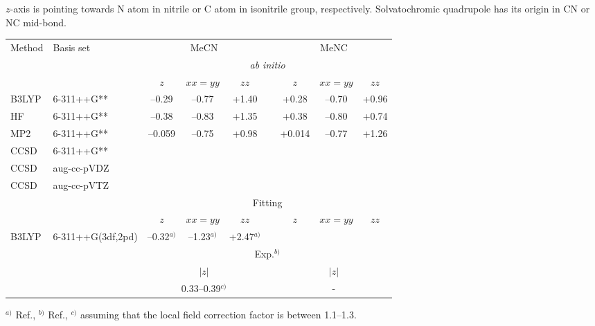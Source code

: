 \documentclass[a4paper,titlepage,twoside,fleqn,12pt]{book}
\begin{document}
\begin{refsection}
\begin{table}[t!]
{$z$-axis is 
pointing towards N atom in nitrile or C atom in isonitrile group, respectively. Solvatochromic 
quadrupole has its origin in CN or NC mid\hyp{}bond.
\label{t:cnnc-solcamm}}
\begin{tabular*}{1.0\textwidth}{@{\extracolsep{\fill} } ll ccc c ccc}
\hline\hline
Method & Basis set    & \multicolumn{3}{c}{MeCN} && \multicolumn{3}{c}{MeNC}                 \\
       &              & \multicolumn{7}{c}{\emph{ab initio}}                                 \\
       &              & $z$     &  $xx=yy$  & $zz$     &&    $z$    &  $xx=yy$    &    $zz$  \\
\cline{3-5} \cline{7-9}
B3LYP  & 6-311++G**   & --0.29  &  --0.77   &  +1.40   &&   +0.28   &   --0.70    &   +0.96  \\
HF     & 6-311++G**   & --0.38  &  --0.83   &  +1.35   &&   +0.38   &   --0.80    &   +0.74  \\
MP2    & 6-311++G**   & --0.059 &  --0.75   &  +0.98   &&   +0.014  &   --0.77    &   +1.26  \\
CCSD   & 6-311++G**   &         &           &          &&           &             &          \\
CCSD   & aug-cc-pVDZ  &         &           &          &&           &             &          \\
CCSD   & aug-cc-pVTZ  &         &           &          &&           &             &          \\
       &              & \multicolumn{7}{c}{Fitting}                                          \\
       &              & $z$     &  $xx=yy$  & $zz$     &&    $z$    &  $xx=yy$    &    $zz$  \\
\cline{3-5} \cline{7-9}
B3LYP  & 6-311++G(3df,2pd) 
                      &  --0.32$^{a)}$ &  --1.23$^{a)}$  & +2.47$^{a)}$  && & &              \\
       &              & \multicolumn{7}{c}{Exp.$^{b)}$}                                      \\
       &              & \multicolumn{3}{c}{$\vert z\vert$}    && \multicolumn{3}{c}{$\vert z\vert$} 
                                                                                             \\
\cline{3-5} \cline{7-9}
       &              & \multicolumn{3}{c}{0.33--0.39$^{c)}$} && \multicolumn{3}{c}{-}       \\
\hline\hline
\end{tabular*}
\begin{footnotesize}
$^{a)}$ Ref.\citep{Lee.Choi.Cho.JCP.2012}, 
$^{b)}$ Ref.\citep{Andrews.Boxer.JPCA.2000}, 
$^{c)}$ assuming that the local field correction factor is between 1.1--1.3.
\end{footnotesize}
\end{table}
%


\end{refsection}
\end{document}
